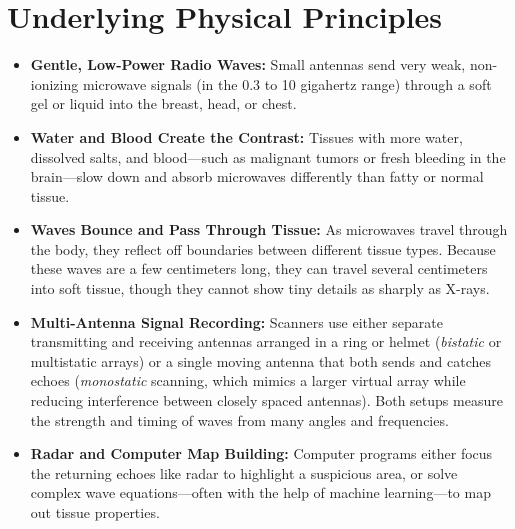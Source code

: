 \section{Underlying Physical Principles}
\begin{itemize}
  \item \textbf{Gentle, Low-Power Radio Waves:} Small antennas send very weak, non-ionizing microwave signals (in the 0.3 to 10 gigahertz range) through a soft gel or liquid into the breast, head, or chest.
  \item \textbf{Water and Blood Create the Contrast:} Tissues with more water, dissolved salts, and blood---such as malignant tumors or fresh bleeding in the brain---slow down and absorb microwaves differently than fatty or normal tissue.
  \item \textbf{Waves Bounce and Pass Through Tissue:} As microwaves travel through the body, they reflect off boundaries between different tissue types. Because these waves are a few centimeters long, they can travel several centimeters into soft tissue, though they cannot show tiny details as sharply as X-rays.
  \item \textbf{Multi-Antenna Signal Recording:} Scanners use either separate transmitting and receiving antennas arranged in a ring or helmet (\emph{bistatic} or multistatic arrays) or a single moving antenna that both sends and catches echoes (\emph{monostatic} scanning, which mimics a larger virtual array while reducing interference between closely spaced antennas). Both setups measure the strength and timing of waves from many angles and frequencies.
  \item \textbf{Radar and Computer Map Building:} Computer programs either focus the returning echoes like radar to highlight a suspicious area, or solve complex wave equations---often with the help of machine learning---to map out tissue properties.
\end{itemize}

